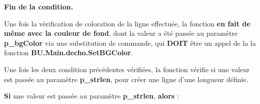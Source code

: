 \documentclass[a4paper,10pt]{article}
\begin{document}
\begin{justify}
    \textbf{\color{cond}Fin de la condition.}
\end{justify}

\setlength{\parskip}{2em}


\begin{justify}
    Une fois la vérification de coloration de la ligne effectuée, la fonction \textbf{\color{cond}en fait de même avec la couleur de fond}, dont la valeur a été passée au paramètre \textbf{\color{vars}p\_bgColor} via une substitution de commande, qui \textbf{DOIT} être un appel de la la fonction \textbf{\color{func}BU.Main.decho.SetBGColor}.
\end{justify}\setlength{\parskip}{1em}

\begin{justify}
    Une fois les deux condition précédentes vérifiées, la fonction vérifie si une valeur est passée au paramètre \textbf{\color{vars}p\_strlen}, pour créer une ligne d'une longueur définie.
\end{justify}

\setlength{\parskip}{2em}


\begin{justify}
    \textbf{\color{cond}Si} une valeur est passée au paramètre \textbf{\color{vars}p\_strlen}, \textbf{\color{cond}alors} :\par
\end{justify}\setlength{\parskip}{1em}
\end{document}
